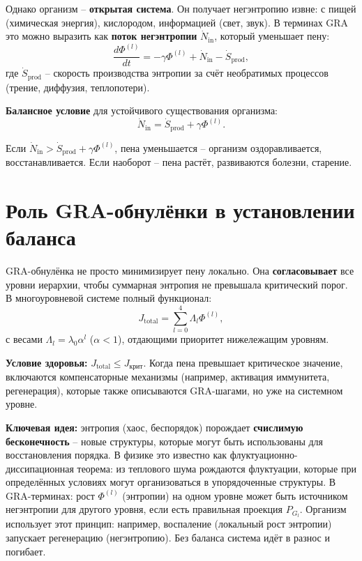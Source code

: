 \documentclass[12pt,a4paper]{article}
\begin{document}
Однако организм – \textbf{открытая система}. Он получает негэнтропию извне: с пищей (химическая энергия), кислородом, информацией (свет, звук). В терминах GRA это можно выразить как \textbf{поток негэнтропии} \(\dot{N}_{\text{in}}\), который уменьшает пену:
\[
\frac{d\Phi^{(l)}}{dt} = -\gamma \Phi^{(l)} + \dot{N}_{\text{in}} - \dot{S}_{\text{prod}},
\]
где \(\dot{S}_{\text{prod}}\) – скорость производства энтропии за счёт необратимых процессов (трение, диффузия, теплопотери).

\textbf{Балансное условие} для устойчивого существования организма:
\[
\dot{N}_{\text{in}} = \dot{S}_{\text{prod}} + \gamma \Phi^{(l)}.
\]

Если \(\dot{N}_{\text{in}} > \dot{S}_{\text{prod}} + \gamma \Phi^{(l)}\), пена уменьшается – организм оздоравливается, восстанавливается. Если наоборот – пена растёт, развиваются болезни, старение.

\section{Роль GRA-обнулёнки в установлении баланса}

GRA-обнулёнка не просто минимизирует пену локально. Она \textbf{согласовывает} все уровни иерархии, чтобы суммарная энтропия не превышала критический порог. В многоуровневой системе полный функционал:
\[
J_{\text{total}} = \sum_{l=0}^{4} \Lambda_l \Phi^{(l)},
\]
с весами \(\Lambda_l = \lambda_0 \alpha^l\) (\(\alpha < 1\)), отдающими приоритет нижележащим уровням.

\textbf{Условие здоровья:} \(J_{\text{total}} \le J_{\text{крит}}\). Когда пена превышает критическое значение, включаются компенсаторные механизмы (например, активация иммунитета, регенерация), которые также описываются GRA-шагами, но уже на системном уровне.

\textbf{Ключевая идея:} энтропия (хаос, беспорядок) порождает \textbf{счислимую бесконечность} – новые структуры, которые могут быть использованы для восстановления порядка. В физике это известно как флуктуационно-диссипационная теорема: из теплового шума рождаются флуктуации, которые при определённых условиях могут организоваться в упорядоченные структуры. В GRA-терминах: рост \(\Phi^{(l)}\) (энтропии) на одном уровне может быть источником негэнтропии для другого уровня, если есть правильная проекция \(P_{G_l}\). Организм использует этот принцип: например, воспаление (локальный рост энтропии) запускает регенерацию (негэнтропию). Без баланса система идёт в разнос и погибает.
\end{document}
